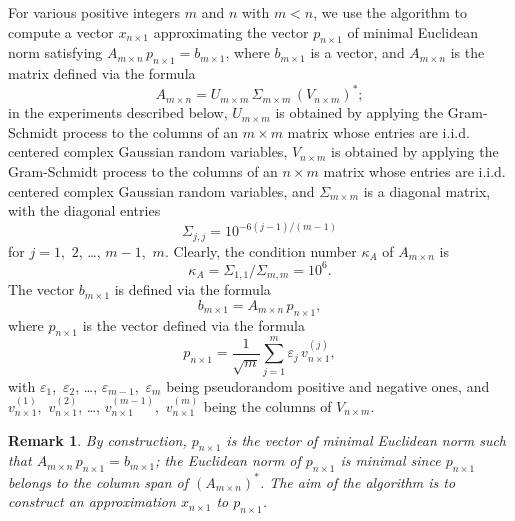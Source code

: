 \documentclass[letterpaper,12pt]{article}
\def\epsilon{\varepsilon}
\newtheorem{remark1}[theorem]{Remark}
\newenvironment{remark}{\begin{remark1} \rm}{\end{remark1}}
\begin{document}
For various positive integers $m$ and $n$ with $m < n$,
we use the algorithm to compute a vector $x_{n \times 1}$
approximating the vector $p_{n \times 1}$ of minimal Euclidean norm
satisfying $A_{m \times n} \, p_{n \times 1} = b_{m \times 1}$,
where $b_{m \times 1}$ is a vector,
and $A_{m \times n}$ is the matrix defined via the formula
\begin{equation}
\label{matrix_definition}
A_{m \times n} = U_{m \times m} \, \Sigma_{m \times m} \, (V_{n \times m})^*;
\end{equation}
in the experiments described below,
$U_{m \times m}$ is obtained by applying the Gram-Schmidt process
to the columns of an $m \times m$ matrix whose entries are
i.i.d. centered complex Gaussian random variables,
$V_{n \times m}$ is obtained by applying the Gram-Schmidt process
to the columns of an $n \times m$ matrix whose entries are
i.i.d. centered complex Gaussian random variables,
and $\Sigma_{m \times m}$ is a diagonal matrix, with the diagonal entries
\begin{equation}
\Sigma_{j,j} = 10^{-6(j-1)/(m-1)}
\end{equation}
for $j = 1$,~$2$, \dots, $m-1$,~$m$.
Clearly, the condition number $\kappa_A$ of $A_{m \times n}$ is
\begin{equation}
\label{condnum}
\kappa_A = \Sigma_{1,1}/\Sigma_{m,m} = 10^6.
\end{equation}
The vector $b_{m \times 1}$ is defined via the formula
\begin{equation}
\label{rhs_definition}
b_{m \times 1} = A_{m \times n} \, p_{n \times 1},
\end{equation}
where $p_{n \times 1}$ is the vector defined via the formula
\begin{equation}
\label{exact_solution}
p_{n \times 1}
= \frac{1}{\sqrt{m}} \sum_{j=1}^m \epsilon_j \, v_{n \times 1}^{(j)},
\end{equation}
with $\epsilon_1$,~$\epsilon_2$, \dots, $\epsilon_{m-1}$,~$\epsilon_m$
being pseudorandom positive and negative ones,
and $v_{n \times 1}^{(1)}$,~$v_{n \times 1}^{(2)}$, \dots,
$v_{n \times 1}^{(m-1)}$,~$v_{n \times 1}^{(m)}$ being the columns
of $V_{n \times m}$.

\begin{remark}
By construction, $p_{n \times 1}$ is the vector of minimal Euclidean norm
such that $A_{m \times n} \, p_{n \times 1} = b_{m \times 1}$;
the Euclidean norm of $p_{n \times 1}$ is minimal since $p_{n \times 1}$
belongs to the column span of $(A_{m \times n})^*$.
The aim of the algorithm is to construct an approximation $x_{n \times 1}$
to $p_{n \times 1}$.
\end{remark}
\end{document}
